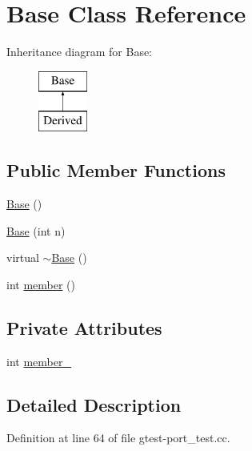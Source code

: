 \hypertarget{classtesting_1_1internal_1_1Base}{\section{\-Base \-Class \-Reference}
\label{db/de3/classtesting_1_1internal_1_1Base}
}
\-Inheritance diagram for \-Base\-:\begin{figure}[H]
\begin{center}
\leavevmode
\includegraphics[height=2.000000cm]{db/de3/classtesting_1_1internal_1_1Base}
\end{center}
\end{figure}
\subsection*{\-Public \-Member \-Functions}
\begin{DoxyCompactItemize}
\item 
\hyperlink{classtesting_1_1internal_1_1Base_a7aaef43170ec1e256ef17ef95ce8a3f9}{\-Base} ()
\item 
\hyperlink{classtesting_1_1internal_1_1Base_a41c8a3416a8ff0fb54603f54fc3c2f64}{\-Base} (int n)
\item 
virtual \hyperlink{classtesting_1_1internal_1_1Base_ab17400c34fd9a83e4dce6dab85c37039}{$\sim$\-Base} ()
\item 
int \hyperlink{classtesting_1_1internal_1_1Base_ad5e51c0c489f18275c211f3a0bf89a9d}{member} ()
\end{DoxyCompactItemize}
\subsection*{\-Private \-Attributes}
\begin{DoxyCompactItemize}
\item 
int \hyperlink{classtesting_1_1internal_1_1Base_acc36a534f367857aeca412cf2f57a75a}{member\-\_\-}
\end{DoxyCompactItemize}


\subsection{\-Detailed \-Description}


\-Definition at line 64 of file gtest-\/port\-\_\-test.\-cc.



